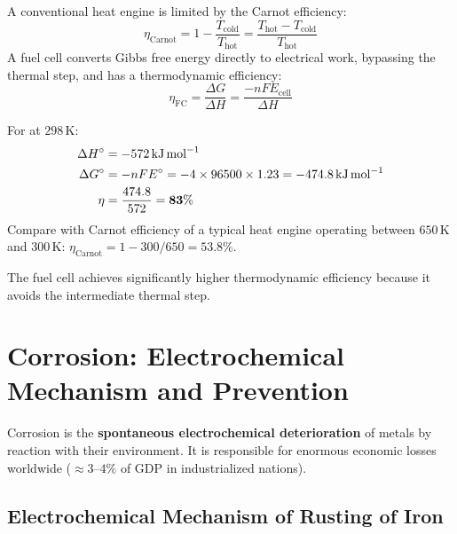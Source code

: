 A conventional heat engine is limited by the Carnot efficiency:
\begin{equation}
    \eta_{\text{Carnot}} = 1 - \frac{T_{\text{cold}}}{T_{\text{hot}}} = \frac{T_{\text{hot}} - T_{\text{cold}}}{T_{\text{hot}}}
\end{equation}
A fuel cell converts Gibbs free energy directly to electrical work, bypassing the thermal step, and has a thermodynamic efficiency:
\begin{equation}
    \boxed{\eta_{\text{FC}} = \frac{\Delta G}{\Delta H} = \frac{-nFE_{\text{cell}}}{\Delta H}}
\end{equation}

\begin{examplebox}
For  at $298\,\text{K}$:
\begin{align*}
\Delta H^\circ &= -572\,\text{kJ\,mol}^{-1}\\
\Delta G^\circ &= -nFE^\circ = -4 \times 96500 \times 1.23 = -474.8\,\text{kJ\,mol}^{-1}\\
\eta &= \frac{474.8}{572} = \mathbf{83\%}
\end{align*}
Compare with Carnot efficiency of a typical heat engine operating between $650\,\text{K}$ and $300\,\text{K}$:
$\eta_{\text{Carnot}} = 1 - 300/650 = 53.8\%$.

The fuel cell achieves significantly higher thermodynamic efficiency because it avoids the intermediate thermal step.
\end{examplebox}

\section{Corrosion: Electrochemical Mechanism and Prevention}

Corrosion is the \textbf{spontaneous electrochemical deterioration} of metals by reaction with their environment. It is responsible for enormous economic losses worldwide ($\approx3\text{--}4\%$ of GDP in industrialized nations).

\subsection{Electrochemical Mechanism of Rusting of Iron}

